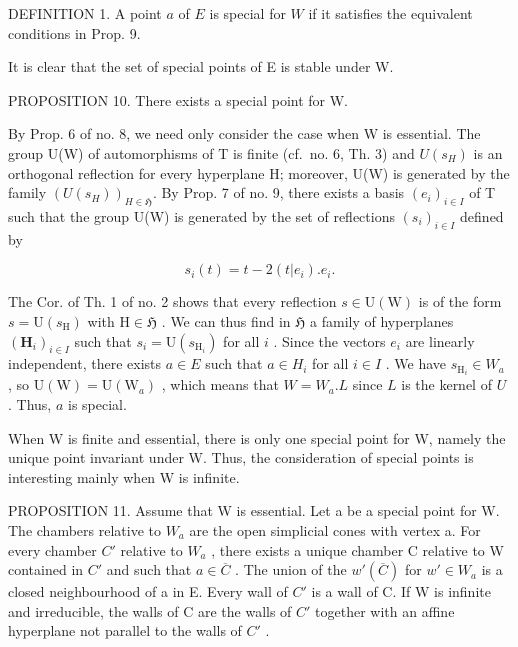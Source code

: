 DEFINITION 1. A point \(a\) of \(E\) is special for \(W\) if it satisfies the equivalent conditions in Prop. 9.

It is clear that the set of special points of E is stable under W.

PROPOSITION 10. There exists a special point for W.

By Prop. 6 of no. 8, we need only consider the case when W is essential. The group U(W) of automorphisms of T is finite (cf.~no. 6, Th. 3) and \(U(s_{H})\) is an orthogonal reflection for every hyperplane H; moreover, U(W) is generated by the family \((U(s_{H}))_{H \in \mathfrak{H}}\). By Prop. 7 of no. 9, there exists a basis \((e_{i})_{i \in I}\) of T such that the group U(W) is generated by the set of reflections \((s_{i})_{i \in I}\) defined by

\[
s _ {i} (t) = t - 2 (t | e _ {i}). e _ {i}.
\]

The Cor. of Th. 1 of no. 2 shows that every reflection \(s \in \mathrm{U}(\mathrm{W})\) is of the form \(s = \mathrm{U}(s_{\mathrm{H}})\) with \(\mathrm{H} \in \mathfrak{H}\) . We can thus find in \(\mathfrak{H}\) a family of hyperplanes \((\mathbf{H}_i)_{i \in I}\) such that \(s_i = \mathrm{U}(s_{\mathrm{H}_i})\) for all \(i\) . Since the vectors \(e_i\) are linearly independent, there exists \(a \in E\) such that \(a \in H_i\) for all \(i \in I\) . We have \(s_{\mathrm{H}_i} \in W_a\) , so \(\mathrm{U}(\mathrm{W}) = \mathrm{U}(\mathrm{W}_a)\) , which means that \(W = W_a.L\) since \(L\) is the kernel of \(U\) . Thus, \(a\) is special.

When W is finite and essential, there is only one special point for W, namely the unique point invariant under W. Thus, the consideration of special points is interesting mainly when W is infinite.

PROPOSITION 11. Assume that W is essential. Let a be a special point for W. The chambers relative to \(W_{a}\) are the open simplicial cones with vertex a. For every chamber \(C'\) relative to \(W_{a}\) , there exists a unique chamber C relative to W contained in \(C'\) and such that \(a \in \overline{C}\) . The union of the \(w'(\overline{C})\) for \(w' \in W_{a}\) is a closed neighbourhood of a in E. Every wall of \(C'\) is a wall of C. If W is infinite and irreducible, the walls of C are the walls of \(C'\) together with an affine hyperplane not parallel to the walls of \(C'\) .

